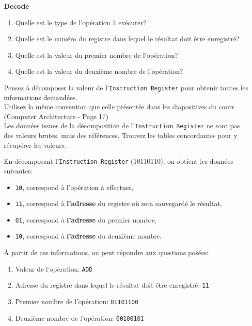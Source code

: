 \begin{Exercice}[10 minutes] \textbf{Decode}
    \begin{enumerate}
        \item Quelle est le type de l'opération à exécuter?
        \item Quelle est le numéro du registre dans lequel le résultat doit être enregistré?
        \item Quelle est la valeur du premier nombre de l'opération?
        \item Quelle est la valeur du deuxième nombre de l'opération?
    \end{enumerate}

    \begin{conseil}
        Pensez à décomposer la valeur de l'\lstinline{Instruction Register} pour obtenir toutes les informations demandées. \\
        Utilisez la même convention que celle présentée dans les diapositives du cours (Computer Architecture - Page 17) \\
        Les données issues de la décomposition de l'\lstinline{Instruction Register} ne sont pas des valeurs brutes, mais des références. Trouvez les tables concordantes pour y récupérer les valeurs.
    \end{conseil}

    \begin{solution}
        En décomposant l'\lstinline{Instruction Register} (10110110), on obtient les données suivantes:
        \begin{itemize}
            \item \lstinline{10}, correspond à l'opération à effectuer,
            \item \lstinline{11}, correspond à \textbf{l'adresse} du registre où sera sauvegardé le résultat,
            \item \lstinline{01}, correspond à \textbf{l'adresse} du premier nombre,
            \item \lstinline{10}, correspond à \textbf{l'adresse} du deuxième nombre.\\
        \end{itemize}
        
    À partir de ces informations, on peut répondre aux questions posées:
       \begin{enumerate}
           \item Valeur de l'opération: \lstinline{ADD}
           \item Adresse du registre dans lequel le résultat doit être enregistré: \lstinline{11}
           \item Premier nombre de l'opération: \lstinline{01101100}
           \item Deuxième nombre de l'opération: \lstinline{00100101}
       \end{enumerate}
    \end{solution}
\end{Exercice}

